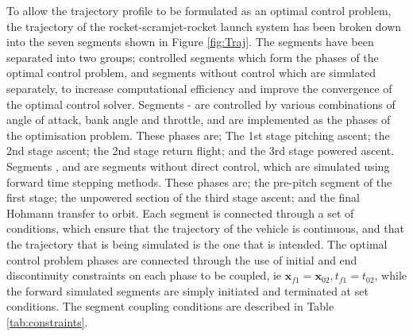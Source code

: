  To allow the trajectory profile to be formulated as an optimal control problem, the trajectory of the rocket-scramjet-rocket launch system has been broken down into the seven segments shown in Figure \ref{fig:Traj}. 
  The segments have been separated into two groups; controlled segments which form the phases of the optimal control problem, and segments without control which are simulated separately, to increase computational efficiency and improve the convergence of the optimal control solver.  
 Segments \textcolor{red}{-} are controlled by various combinations of angle of attack, bank angle and throttle, and are implemented as the phases of the optimisation problem. These phases are; The 1st stage pitching ascent; the 2nd stage ascent; the 2nd stage return flight; and the 3rd stage powered ascent.
 Segments \textcolor{red}{},\textcolor{red}{} and \textcolor{red}{} are segments without direct control, which are simulated using forward time stepping methods. 
 These phases are; the pre-pitch segment of the first stage; the unpowered section of the third stage ascent; and the final Hohmann transfer to orbit. 
 Each segment is connected through a set of conditions, which ensure that the trajectory of the vehicle is continuous, and that the trajectory that is being simulated is the one that is intended. 
  The optimal control problem phases are connected through the use of initial and end discontinuity constraints on each phase to be coupled, ie $\textbf{x}_{f1} = \textbf{x}_{02}, t_{f1} = t_{02}$, while the forward simulated segments are simply initiated and terminated at set conditions. 
 The segment coupling conditions are described in Table \ref{tab:constraints}.






